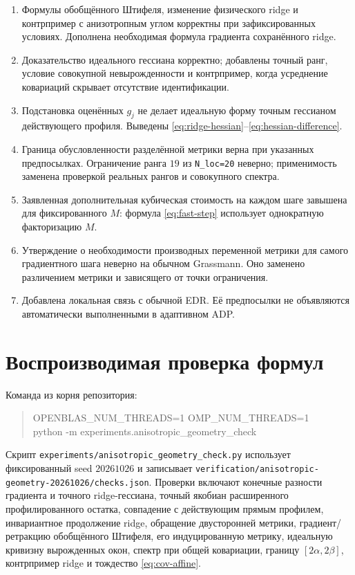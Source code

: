 \documentclass[11pt,a4paper]{article}
\newcommand{\code}[1]{\nolinkurl{#1}}
\theoremstyle{remark}
\begin{document}
\begin{enumerate}
\item Формулы обобщённого Штифеля, изменение физического ridge и
контрпример с анизотропным углом корректны при зафиксированных условиях.
Дополнена необходимая формула градиента сохранённого ridge.
\item Доказательство идеального гессиана корректно; добавлены точный ранг,
условие совокупной невырожденности и контрпример, когда усреднение
ковариаций скрывает отсутствие идентификации.
\item Подстановка оценённых $g_j$ не делает идеальную форму точным
гессианом действующего профиля. Выведены
\eqref{eq:ridge-hessian}--\eqref{eq:hessian-difference}.
\item Граница обусловленности разделённой метрики верна при указанных
предпосылках. Ограничение ранга $19$ из \code{N_loc=20} неверно;
применимость заменена проверкой реальных рангов и совокупного спектра.
\item Заявленная дополнительная кубическая стоимость на каждом шаге
завышена для фиксированного $M$: формула \eqref{eq:fast-step} использует
однократную факторизацию $M$.
\item Утверждение о необходимости производных переменной метрики для
самого градиентного шага неверно на обычном Grassmann. Оно заменено
различением метрики и зависящего от точки ограничения.
\item Добавлена локальная связь с обычной EDR. Её предпосылки не
объявляются автоматически выполненными в адаптивном ADP.
\end{enumerate}

\section{Воспроизводимая проверка формул}

Команда из корня репозитория:
\begin{quote}\ttfamily\small
OPENBLAS\_NUM\_THREADS=1 OMP\_NUM\_THREADS=1\\
python -m experiments.anisotropic\_geometry\_check
\end{quote}
Скрипт \code{experiments/anisotropic_geometry_check.py} использует
фиксированный seed $20261026$ и записывает
\code{verification/anisotropic-geometry-20261026/checks.json}.
Проверки включают конечные разности градиента и точного ridge-гессиана,
точный якобиан расширенного профилированного остатка, совпадение с
действующим прямым профилем, инвариантное продолжение ridge,
обращение двусторонней метрики, градиент/ретракцию обобщённого Штифеля,
его индуцированную метрику, идеальную кривизну вырожденных окон,
спектр при общей ковариации, границу $[2\alpha,2\beta]$,
контрпример ridge и тождество \eqref{eq:cov-affine}.
\end{document}
